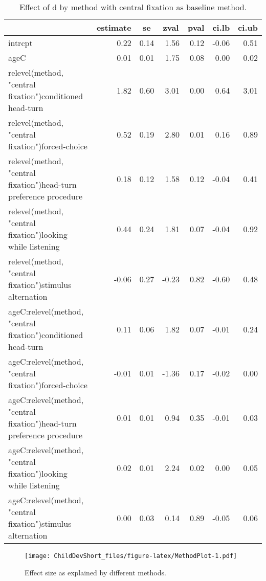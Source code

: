 \documentclass[english,floatsintext,man]{apa6}
\begin{document}
\begin{table}[tbp]
\begin{center}
\begin{threeparttable}
\caption{Effect of d by method with central fixation as baseline method.}
\begin{tabular}{lrrrrrr}
\toprule
 & \multicolumn{1}{c}{estimate} & \multicolumn{1}{c}{se} & \multicolumn{1}{c}{zval} & \multicolumn{1}{c}{pval} & \multicolumn{1}{c}{ci.lb} & \multicolumn{1}{c}{ci.ub}\\
\midrule
intrcpt & 0.22 & 0.14 & 1.56 & 0.12 & -0.06 & 0.51\\
ageC & 0.01 & 0.01 & 1.75 & 0.08 & 0.00 & 0.02\\
relevel(method, "central fixation")conditioned head-turn & 1.82 & 0.60 & 3.01 & 0.00 & 0.64 & 3.01\\
relevel(method, "central fixation")forced-choice & 0.52 & 0.19 & 2.80 & 0.01 & 0.16 & 0.89\\
relevel(method, "central fixation")head-turn preference procedure & 0.18 & 0.12 & 1.58 & 0.12 & -0.04 & 0.41\\
relevel(method, "central fixation")looking while listening & 0.44 & 0.24 & 1.81 & 0.07 & -0.04 & 0.92\\
relevel(method, "central fixation")stimulus alternation & -0.06 & 0.27 & -0.23 & 0.82 & -0.60 & 0.48\\
ageC:relevel(method, "central fixation")conditioned head-turn & 0.11 & 0.06 & 1.82 & 0.07 & -0.01 & 0.24\\
ageC:relevel(method, "central fixation")forced-choice & -0.01 & 0.01 & -1.36 & 0.17 & -0.02 & 0.00\\
ageC:relevel(method, "central fixation")head-turn preference procedure & 0.01 & 0.01 & 0.94 & 0.35 & -0.01 & 0.03\\
ageC:relevel(method, "central fixation")looking while listening & 0.02 & 0.01 & 2.24 & 0.02 & 0.00 & 0.05\\
ageC:relevel(method, "central fixation")stimulus alternation & 0.00 & 0.03 & 0.14 & 0.89 & -0.05 & 0.06\\
\bottomrule
\end{tabular}
\end{threeparttable}
\end{center}
\end{table}

\begin{figure}[htbp]
\centering
\texttt{[image: ChildDevShort\_files/figure-latex/MethodPlot-1.pdf]}
\caption{Effect size as explained by different methods.}
\end{figure}
\end{document}
